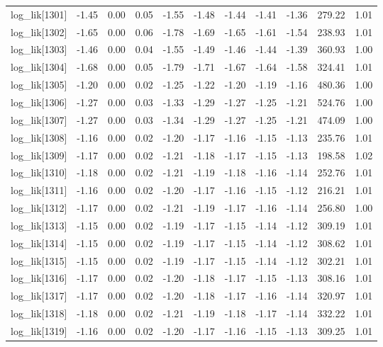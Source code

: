 \begin{table}[ht]
\begin{tabular}{rrrrrrrrrrr}
  log\_lik[1301] & -1.45 & 0.00 & 0.05 & -1.55 & -1.48 & -1.44 & -1.41 & -1.36 & 279.22 & 1.01 \\ 
  log\_lik[1302] & -1.65 & 0.00 & 0.06 & -1.78 & -1.69 & -1.65 & -1.61 & -1.54 & 238.93 & 1.01 \\ 
  log\_lik[1303] & -1.46 & 0.00 & 0.04 & -1.55 & -1.49 & -1.46 & -1.44 & -1.39 & 360.93 & 1.00 \\ 
  log\_lik[1304] & -1.68 & 0.00 & 0.05 & -1.79 & -1.71 & -1.67 & -1.64 & -1.58 & 324.41 & 1.01 \\ 
  log\_lik[1305] & -1.20 & 0.00 & 0.02 & -1.25 & -1.22 & -1.20 & -1.19 & -1.16 & 480.36 & 1.00 \\ 
  log\_lik[1306] & -1.27 & 0.00 & 0.03 & -1.33 & -1.29 & -1.27 & -1.25 & -1.21 & 524.76 & 1.00 \\ 
  log\_lik[1307] & -1.27 & 0.00 & 0.03 & -1.34 & -1.29 & -1.27 & -1.25 & -1.21 & 474.09 & 1.00 \\ 
  log\_lik[1308] & -1.16 & 0.00 & 0.02 & -1.20 & -1.17 & -1.16 & -1.15 & -1.13 & 235.76 & 1.01 \\ 
  log\_lik[1309] & -1.17 & 0.00 & 0.02 & -1.21 & -1.18 & -1.17 & -1.15 & -1.13 & 198.58 & 1.02 \\ 
  log\_lik[1310] & -1.18 & 0.00 & 0.02 & -1.21 & -1.19 & -1.18 & -1.16 & -1.14 & 252.76 & 1.01 \\ 
  log\_lik[1311] & -1.16 & 0.00 & 0.02 & -1.20 & -1.17 & -1.16 & -1.15 & -1.12 & 216.21 & 1.01 \\ 
  log\_lik[1312] & -1.17 & 0.00 & 0.02 & -1.21 & -1.19 & -1.17 & -1.16 & -1.14 & 256.80 & 1.00 \\ 
  log\_lik[1313] & -1.15 & 0.00 & 0.02 & -1.19 & -1.17 & -1.15 & -1.14 & -1.12 & 309.19 & 1.01 \\ 
  log\_lik[1314] & -1.15 & 0.00 & 0.02 & -1.19 & -1.17 & -1.15 & -1.14 & -1.12 & 308.62 & 1.01 \\ 
  log\_lik[1315] & -1.15 & 0.00 & 0.02 & -1.19 & -1.17 & -1.15 & -1.14 & -1.12 & 302.21 & 1.01 \\ 
  log\_lik[1316] & -1.17 & 0.00 & 0.02 & -1.20 & -1.18 & -1.17 & -1.15 & -1.13 & 308.16 & 1.01 \\ 
  log\_lik[1317] & -1.17 & 0.00 & 0.02 & -1.20 & -1.18 & -1.17 & -1.16 & -1.14 & 320.97 & 1.01 \\ 
  log\_lik[1318] & -1.18 & 0.00 & 0.02 & -1.21 & -1.19 & -1.18 & -1.17 & -1.14 & 332.22 & 1.01 \\ 
  log\_lik[1319] & -1.16 & 0.00 & 0.02 & -1.20 & -1.17 & -1.16 & -1.15 & -1.13 & 309.25 & 1.01 \\ 

\end{tabular}
\end{table}
